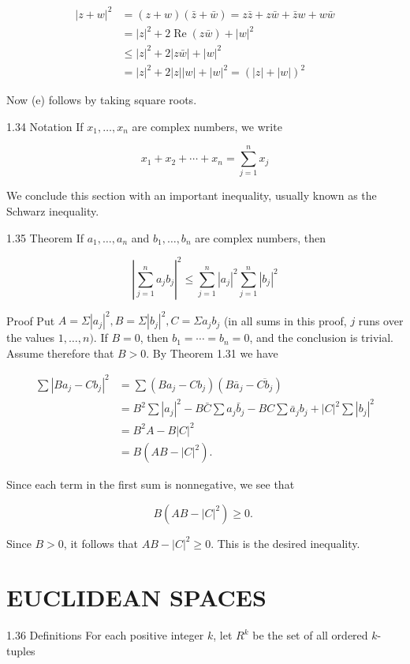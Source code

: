 \documentclass[10pt]{article}
\begin{document}
$$
\begin{aligned}
|z+w|^{2} & =(z+w)(\bar{z}+\bar{w})=z \bar{z}+z \bar{w}+\bar{z} w+w \bar{w} \\
& =|z|^{2}+2 \operatorname{Re}(z \bar{w})+|w|^{2} \\
& \leq|z|^{2}+2|z \bar{w}|+|w|^{2} \\
& =|z|^{2}+2|z||w|+|w|^{2}=(|z|+|w|)^{2}
\end{aligned}
$$

Now (e) follows by taking square roots.

1.34 Notation If $x_{1}, \ldots, x_{n}$ are complex numbers, we write

$$
x_{1}+x_{2}+\cdots+x_{n}=\sum_{j=1}^{n} x_{j}
$$

We conclude this section with an important inequality, usually known as the Schwarz inequality.

1.35 Theorem If $a_{1}, \ldots, a_{n}$ and $b_{1}, \ldots, b_{n}$ are complex numbers, then

$$
\left|\sum_{j=1}^{n} a_{j} b_{j}\right|^{2} \leq \sum_{j=1}^{n}\left|a_{j}\right|^{2} \sum_{j=1}^{n}\left|b_{j}\right|^{2}
$$

Proof Put $A=\Sigma\left|a_{j}\right|^{2}, B=\Sigma\left|b_{j}\right|^{2}, C=\Sigma a_{j} b_{j}$ (in all sums in this proof, $j$ runs over the values $1, \ldots, n)$. If $B=0$, then $b_{1}=\cdots=b_{n}=0$, and the conclusion is trivial. Assume therefore that $B>0$. By Theorem 1.31 we have

$$
\begin{aligned}
\sum\left|B a_{j}-C b_{j}\right|^{2} & =\sum\left(B a_{j}-C b_{j}\right)\left(B \bar{a}_{j}-\overline{C b_{j}}\right) \\
& =B^{2} \sum\left|a_{j}\right|^{2}-B \bar{C} \sum a_{j} \bar{b}_{j}-B C \sum \bar{a}_{j} b_{j}+|C|^{2} \sum\left|b_{j}\right|^{2} \\
& =B^{2} A-B|C|^{2} \\
& =B\left(A B-|C|^{2}\right) .
\end{aligned}
$$

Since each term in the first sum is nonnegative, we see that

$$
B\left(A B-|C|^{2}\right) \geq 0 \text {. }
$$

Since $B>0$, it follows that $A B-|C|^{2} \geq 0$. This is the desired inequality.

\section{EUCLIDEAN SPACES}
1.36 Definitions For each positive integer $k$, let $R^{k}$ be the set of all ordered $k$-tuples
\end{document}
